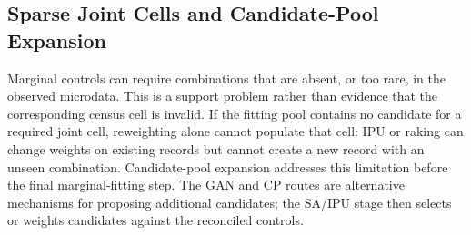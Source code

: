 ﻿%

\subsection{Sparse Joint Cells and Candidate-Pool Expansion}
\label{sec:missing_cells_framework}

Marginal controls can require combinations that are absent, or too rare, in
the observed microdata. This is a support problem rather than evidence that
the corresponding census cell is invalid. If the fitting pool contains no
candidate for a required joint cell, reweighting alone cannot populate that
cell: IPU or raking can change weights on existing records but cannot create a
new record with an unseen combination. Candidate-pool expansion addresses this
limitation before the final marginal-fitting step. The GAN and CP routes are
alternative mechanisms for proposing additional candidates; the SA/IPU stage
then selects or weights candidates against the reconciled controls.


